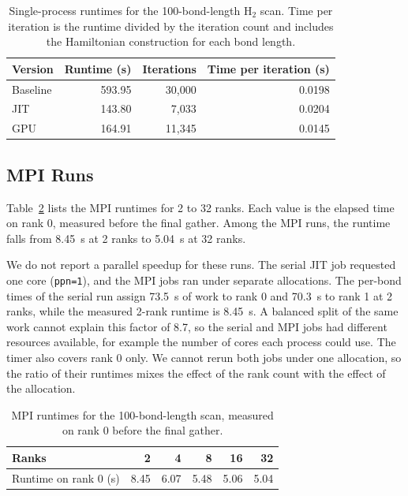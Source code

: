 \documentclass[11pt]{article}
\begin{document}
\begin{table}[t]
    \centering
    \small
    \begin{tabular}{lrrr}
        \toprule
        Version & Runtime (s) & Iterations & Time per iteration (s) \\
        \midrule
        Baseline & 593.95 & 30,000 & 0.0198 \\
        JIT      & 143.80 & 7,033  & 0.0204 \\
        GPU      & 164.91 & 11,345 & 0.0145 \\
        \bottomrule
    \end{tabular}
    \caption{Single-process runtimes for the 100-bond-length H$_2$ scan. Time per iteration is the runtime divided by the iteration count and includes the Hamiltonian construction for each bond length.}
    \label{tab:h2_runtimes}
\end{table}

\subsection{MPI Runs}

Table~\ref{tab:mpi_results} lists the MPI runtimes for 2 to 32 ranks. Each value is the elapsed time on rank 0, measured before the final gather. Among the MPI runs, the runtime falls from 8.45~s at 2 ranks to 5.04~s at 32 ranks.

We do not report a parallel speedup for these runs. The serial JIT job requested one core (\texttt{ppn=1}), and the MPI jobs ran under separate allocations. The per-bond times of the serial run assign 73.5~s of work to rank 0 and 70.3~s to rank 1 at 2 ranks, while the measured 2-rank runtime is 8.45~s. A balanced split of the same work cannot explain this factor of 8.7, so the serial and MPI jobs had different resources available, for example the number of cores each process could use. The timer also covers rank 0 only. We cannot rerun both jobs under one allocation, so the ratio of their runtimes mixes the effect of the rank count with the effect of the allocation.

\begin{table}[t]
    \centering
    \small
    \begin{tabular}{lrrrrr}
        \toprule
        Ranks & 2 & 4 & 8 & 16 & 32 \\
        \midrule
        Runtime on rank 0 (s) & 8.45 & 6.07 & 5.48 & 5.06 & 5.04 \\
        \bottomrule
    \end{tabular}
    \caption{MPI runtimes for the 100-bond-length scan, measured on rank 0 before the final gather.}
    \label{tab:mpi_results}
\end{table}
\end{document}
